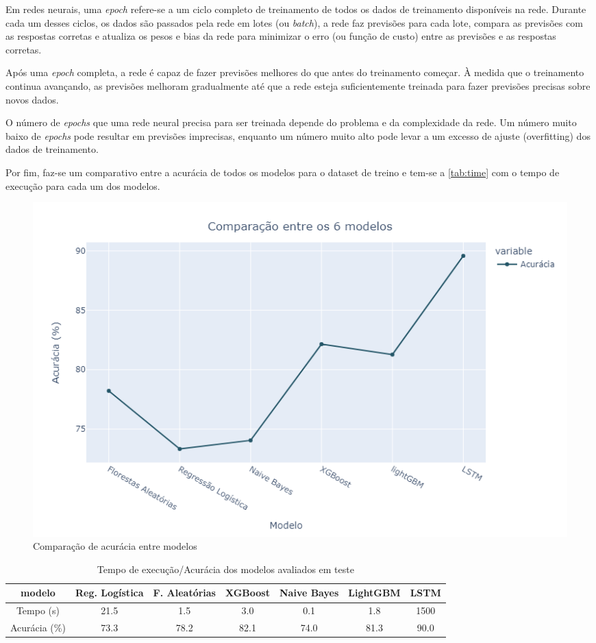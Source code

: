 Em redes neurais, uma \textit{epoch} refere-se a um ciclo completo de treinamento de todos os dados de treinamento disponíveis na rede. Durante cada um desses ciclos, os dados são passados pela rede em lotes (ou \textit{batch}), a rede faz previsões para cada lote, compara as previsões com as respostas corretas e atualiza os pesos e bias da rede para minimizar o erro (ou função de custo) entre as previsões e as respostas corretas.

Após uma \textit{epoch} completa, a rede é capaz de fazer previsões melhores do que antes do treinamento começar. À medida que o treinamento continua avançando, as previsões melhoram gradualmente até que a rede esteja suficientemente treinada para fazer previsões precisas sobre novos dados.

O número de \textit{epochs} que uma rede neural precisa para ser treinada depende do problema e da complexidade da rede. Um número muito baixo de \textit{epochs} pode resultar em previsões imprecisas, enquanto um número muito alto pode levar a um excesso de ajuste (overfitting) dos dados de treinamento.

Por fim, faz-se um comparativo entre a acurácia de todos os modelos para o dataset de treino e tem-se a \autoref{tab:time} com o tempo de execução para cada um dos modelos.

\begin{figure}[H]
    \centering
    \includegraphics[scale=0.55]{./figs/comparative.png}
    \caption{Comparação de acurácia entre modelos}
    \label{fig:comparative}
\end{figure}

\begin{table}[H]
    \centering
    \small
    \begin{tabular}{c|cccccc}
        \hline
        { modelo}        & { Reg. Logística} & { F. Aleatórias} & { XGBoost} & { Naive Bayes} & LightGBM & LSTM \\ \hline \hline
        { Tempo (s)}     & { 21.5}           & { 1.5}           & { 3.0}     & { 0.1}         & {1.8}    & 1500 \\ \hline
        { Acurácia (\%)} & { 73.3}           & { 78.2}          & { 82.1}    & { 74.0}        & 81.3     & 90.0 \\
    \end{tabular}
    \caption{Tempo de execução/Acurácia dos modelos avaliados em teste}
    \label{tab:time}
\end{table}

